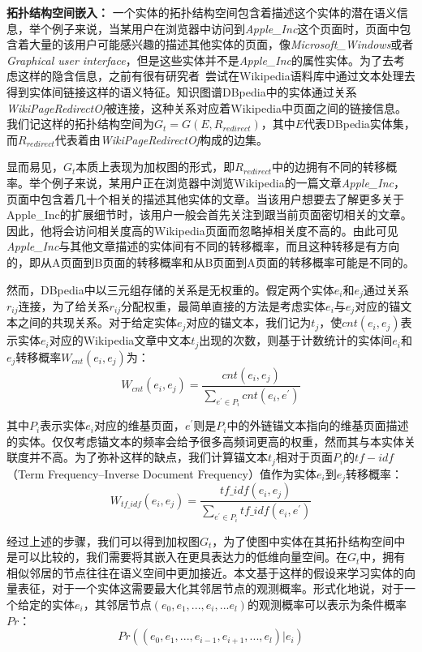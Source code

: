 \textbf{拓扑结构空间嵌入：}
一个实体的拓扑结构空间包含着描述这个实体的潜在语义信息，举个例子来说，当某用户在浏览器中访问到\emph{Apple\_Inc}这个页面时，页面中包含着大量的该用户可能感兴趣的描述其他实体的页面，像\emph{Microsoft\_Windows}或者\emph{Graphical user interface}，但是这些实体并不是\emph{Apple\_Inc}的属性实体。为了去考虑这样的隐含信息，之前有很有研究者~\cite{aaai/ZhangZH15, aaai/GongXH18}尝试在Wikipedia语料库中通过文本处理去得到实体间链接这样的语义特征。知识图谱DBpedia中的实体通过关系\emph{WikiPageRedirectOf}被连接，这种关系对应着Wikipedia中页面之间的链接信息。我们记这样的拓扑结构空间为$G_t = G(E, R_{redirect})$，其中$E$代表DBpedia实体集，而$R_{redirect}$代表着由\emph{WikiPageRedirectOf}构成的边集。

显而易见，$G_t$本质上表现为加权图的形式，即$R_{redirect}$中的边拥有不同的转移概率。举个例子来说，某用户正在浏览器中浏览Wikipedia的一篇文章\emph{Apple\_Inc}，页面中包含着几十个相关的描述其他实体的文章。当该用户想要去了解更多关于{Apple\_Inc}的扩展细节时，该用户一般会首先关注到跟当前页面密切相关的文章。因此，他将会访问相关度高的Wikipedia页面而忽略掉相关度不高的。由此可见\emph{Apple\_Inc}与其他文章描述的实体间有不同的转移概率，而且这种转移是有方向的，即从A页面到B页面的转移概率和从B页面到A页面的转移概率可能是不同的。

然而，DBpedia中以三元组存储的关系是无权重的。假定两个实体$e_i$和$e_j$通过关系$r_{ij}$连接，为了给关系$r_{ij}$分配权重，最简单直接的方法是考虑实体$e_i$与$e_j$对应的锚文本之间的共现关系。对于给定实体$e_j$对应的锚文本，我们记为$t_j$，使$cnt(e_i, e_j)$表示实体$e_i$对应的Wikipedia文章中文本$t_j$出现的次数，则基于计数统计的实体间$e_i$和$e_j$转移概率$W_{cnt}(e_i, e_j)$为：
\begin{equation}
    \label{cng_formula}
    W_{cnt}(e_i, e_j) = \frac{cnt(e_i, e_j)}{\sum_{e^{'} \in P_i}^{ }cnt(e_i, e^{'})}
\end{equation}

\noindent 其中$P_i$表示实体$e_i$对应的维基页面，$e^{'}$则是$P_i$中的外链锚文本指向的维基页面描述的实体。仅仅考虑锚文本的频率会给予很多高频词更高的权重，然而其与本实体关联度并不高。为了弥补这样的缺点，我们计算锚文本$t_j$相对于页面$P_i$的$tf-idf$（Term Frequency–Inverse Document Frequency）值作为实体$e_i$到$e_j$转移概率：
\begin{equation}
    \label{w_tf-idf_formula}
    W_{tf\_idf}(e_i, e_j) = \frac{tf\_idf(e_i, e_j)}{\sum_{e^{'} \in P_i}^{ }tf\_idf(e_i, e^{'})}
\end{equation}



经过上述的步骤，我们可以得到加权图$G_t$，为了使图中实体在其拓扑结构空间中是可以比较的，我们需要将其嵌入在更具表达力的低维向量空间。在$G_t$中，拥有相似邻居的节点往往在语义空间中更加接近。本文基于这样的假设来学习实体的向量表征，对于一个实体这需要最大化其邻居节点的观测概率。形式化地说，对于一个给定的实体$e_i$，其邻居节点$(e_0, e_1, ..., e_i, ...e_l)$的观测概率可以表示为条件概率$Pr$：
\begin{equation}
    \label{pr}
    Pr((e_0, e_1, ..., e_{i-1}, e_{i+1}, ..., e_l)|e_i)
\end{equation}

